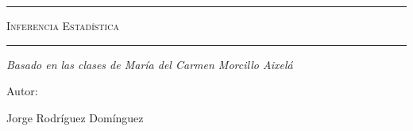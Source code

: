 \begin{titlepage}
    \centering
    {\bfseries\LARGE \ \par}
    \vspace{1cm}
    {\scshape\Large \ \par}
    \vspace{3cm}
    \rule{\linewidth}{0.5mm}
    {\scshape\Huge Inferencia Estadística \par}
    \rule{\linewidth}{0.5mm} \par
    \vspace{3cm}
    {\itshape\Large Basado en las clases de María del Carmen Morcillo Aixelá \par}
    \vfill
    {\Large Autor: \par}
    {\Large Jorge Rodríguez Domínguez \par}
    \vfill
\end{titlepage}
\tableofcontents